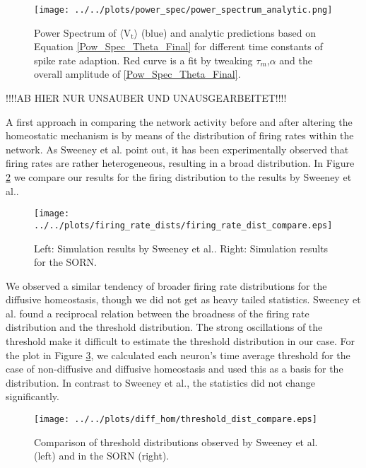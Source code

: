 \documentclass[10pt,a4paper]{article}
\begin{document}
\begin{figure}
\begin{center}
\texttt{[image: ../../plots/power\_spec/power\_spectrum\_analytic.png]}
\end{center}
\caption{Power Spectrum of $\mathrm{\langle V_t \rangle}$ (blue) and analytic predictions based on Equation \eqref{Pow_Spec_Theta_Final} for different time constants of spike rate adaption. Red curve is a fit by tweaking $\tau_m$,$\alpha$ and the overall amplitude of \eqref{Pow_Spec_Theta_Final}.}
\label{Pow_Spec_Theta_vs_Analytic}
\end{figure}


!!!!AB HIER NUR UNSAUBER UND UNAUSGEARBEITET!!!!

A first approach in comparing the network activity before and after altering the homeostatic mechanism is by means of the distribution of firing rates within the network. As Sweeney et al. point out, it has been experimentally observed that firing rates are rather heterogeneous, resulting in a broad distribution. In Figure \ref{firing_rate_dist_comp} we compare our results for the firing distribution to the results by Sweeney et al.. 
\begin{figure}
\texttt{[image: ../../plots/firing\_rate\_dists/firing\_rate\_dist\_compare.eps]}
\caption{Left: Simulation results by Sweeney et al.. Right: Simulation results for the SORN.}
\label{firing_rate_dist_comp}
\end{figure}
We observed a similar tendency of broader firing rate distributions for the diffusive homeostasis, though we did not get as heavy tailed statistics. Sweeney et al. found a reciprocal relation between the broadness of the firing rate distribution and the threshold distribution. The strong oscillations of the threshold make it difficult to estimate the threshold distribution in our case. For the plot in Figure \ref{thresh_dist_comp}, we calculated each neuron's time average threshold for the case of non-diffusive and diffusive homeostasis and used this as a basis for the distribution. In contrast to Sweeney et al., the statistics did not change significantly.
\begin{figure}
\texttt{[image: ../../plots/diff\_hom/threshold\_dist\_compare.eps]}
\caption{Comparison of threshold distributions observed by Sweeney et al. (left) and in the SORN (right).}
\label{thresh_dist_comp}
\end{figure}
\end{document}
